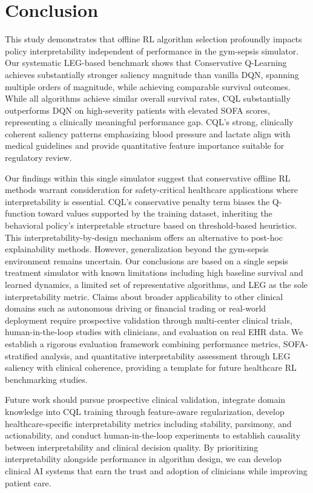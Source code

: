 
\section{Conclusion}\label{sec:conclusion}

This study demonstrates that offline RL algorithm selection profoundly impacts policy interpretability independent of performance in the gym-sepsis simulator. Our systematic LEG-based benchmark shows that Conservative Q-Learning achieves substantially stronger saliency magnitude than vanilla DQN, spanning multiple orders of magnitude, while achieving comparable survival outcomes. While all algorithms achieve similar overall survival rates, CQL substantially outperforms DQN on high-severity patients with elevated SOFA scores, representing a clinically meaningful performance gap. CQL's strong, clinically coherent saliency patterns emphasizing blood pressure and lactate align with medical guidelines and provide quantitative feature importance suitable for regulatory review.

Our findings within this single simulator suggest that conservative offline RL methods warrant consideration for safety-critical healthcare applications where interpretability is essential. CQL's conservative penalty term biases the Q-function toward values supported by the training dataset, inheriting the behavioral policy's interpretable structure based on threshold-based heuristics. This interpretability-by-design mechanism offers an alternative to post-hoc explainability methods. However, generalization beyond the gym-sepsis environment remains uncertain. Our conclusions are based on a single sepsis treatment simulator with known limitations including high baseline survival and learned dynamics, a limited set of representative algorithms, and LEG as the sole interpretability metric. Claims about broader applicability to other clinical domains such as autonomous driving or financial trading or real-world deployment require prospective validation through multi-center clinical trials, human-in-the-loop studies with clinicians, and evaluation on real EHR data. We establish a rigorous evaluation framework combining performance metrics, SOFA-stratified analysis, and quantitative interpretability assessment through LEG saliency with clinical coherence, providing a template for future healthcare RL benchmarking studies.

Future work should pursue prospective clinical validation, integrate domain knowledge into CQL training through feature-aware regularization, develop healthcare-specific interpretability metrics including stability, parsimony, and actionability, and conduct human-in-the-loop experiments to establish causality between interpretability and clinical decision quality. By prioritizing interpretability alongside performance in algorithm design, we can develop clinical AI systems that earn the trust and adoption of clinicians while improving patient care.

